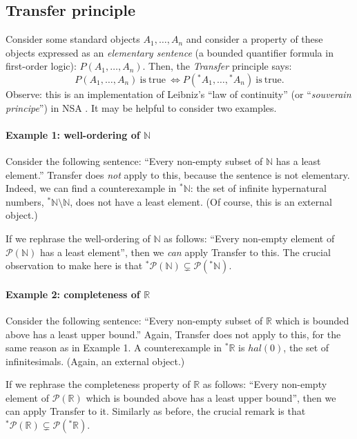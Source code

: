 \subsection{Transfer principle}
Consider some standard objects $A_1,\ldots,A_n$ and consider a property of these objects expressed as an \textit{elementary sentence} (a bounded quantifier formula in first-order logic): $P(A_1,\ldots,A_n)$.
Then, the \textit{Transfer} principle says:
$$
P(A_1,\ldots,A_n) \mathrm{\ is\ true\ } \Leftrightarrow P({^\ast A}_1,\ldots,{^\ast A}_n) \mathrm{\ is\ true}.
$$
Observe: this is an implementation of Leibniz's ``law of continuity'' (or ``\textit{souverain principe}'') in NSA \citep[see ][section~4.3]{KatzSherry:2012a}. It may be helpful to consider two examples.

\paragraph{Example 1: well-ordering of $\mathbb{N}$}
Consider the following sentence: ``Every non-empty subset of $\mathbb{N}$ has a least element.'' Transfer does \emph{not} apply to this, because the sentence is not elementary. Indeed, we can find a counterexample in ${^\ast \mathbb{N}}$: the set of infinite hypernatural numbers, ${^\ast \mathbb{N}} \setminus \mathbb{N}$, does not have a least element. (Of course, this is an external object.)

If we rephrase the well-ordering of $\mathbb{N}$ as follows: ``Every non-empty element of $\mathcal{P}(\mathbb{N})$ has a least element'', then we \emph{can} apply Transfer to this.
The crucial observation to make here is that ${^\ast \mathcal{P}}(\mathbb{N}) \subsetneq \mathcal{P}({^\ast \mathbb{N}})$.

\paragraph{Example 2: completeness of $\mathbb{R}$}
Consider the following sentence: ``Every non-empty subset of $\mathbb{R}$ which is bounded above has a least upper bound.'' Again, Transfer does not apply to this, for the same reason as in Example 1. A counterexample in ${^\ast \mathbb{R}}$ is $hal(0)$, the set of infinitesimals. (Again, an external object.)

If we rephrase the completeness property of $\mathbb{R}$ as follows: ``Every non-empty element of $\mathcal{P}(\mathbb{R})$ which is bounded above has a least upper bound'', then we can apply Transfer to it. Similarly as before, the crucial remark is that ${^\ast \mathcal{P}}(\mathbb{R}) \subsetneq \mathcal{P}({^\ast \mathbb{R}})$.

